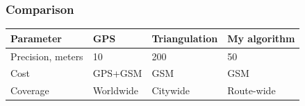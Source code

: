 \documentclass{beamer}
\begin{document}


\begin{frame}[fragile]
	\frametitle{Comparison}
	\begin{tabular}{|p{}|p{}|p{}|p{}|}
		\hline
		{\bf{}Parameter} & {\bf{}GPS} & {\bf{}Triangulation} & {\bf{}My algorithm} \\
		\hline
		Precision, meters & 10 & 200 & 50 \\
		\hline
		Cost & GPS+GSM & GSM & GSM \\
		\hline
		Coverage & Worldwide & Citywide & Route-wide \\
		\hline
	\end{tabular}
\end{frame}
\end{document}
